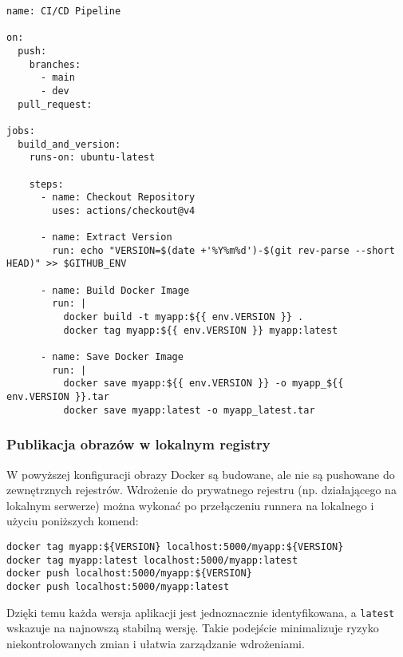 \begin{verbatim}
name: CI/CD Pipeline

on:
  push:
    branches:
      - main
      - dev
  pull_request:

jobs:
  build_and_version:
    runs-on: ubuntu-latest

    steps:
      - name: Checkout Repository
        uses: actions/checkout@v4

      - name: Extract Version
        run: echo "VERSION=$(date +'%Y%m%d')-$(git rev-parse --short HEAD)" >> $GITHUB_ENV

      - name: Build Docker Image
        run: |
          docker build -t myapp:${{ env.VERSION }} .
          docker tag myapp:${{ env.VERSION }} myapp:latest

      - name: Save Docker Image
        run: |
          docker save myapp:${{ env.VERSION }} -o myapp_${{ env.VERSION }}.tar
          docker save myapp:latest -o myapp_latest.tar
\end{verbatim}

\subsubsection{Publikacja obrazów w lokalnym registry}

W powyższej konfiguracji obrazy Docker są budowane, ale nie są pushowane do zewnętrznych rejestrów. Wdrożenie do prywatnego rejestru (np. działającego na lokalnym serwerze) można wykonać po przełączeniu runnera na lokalnego i użyciu poniższych komend:

\begin{verbatim}
docker tag myapp:${VERSION} localhost:5000/myapp:${VERSION}
docker tag myapp:latest localhost:5000/myapp:latest
docker push localhost:5000/myapp:${VERSION}
docker push localhost:5000/myapp:latest
\end{verbatim}

Dzięki temu każda wersja aplikacji jest jednoznacznie identyfikowana, a \texttt{latest} wskazuje na najnowszą stabilną wersję. Takie podejście minimalizuje ryzyko niekontrolowanych zmian i ułatwia zarządzanie wdrożeniami.
